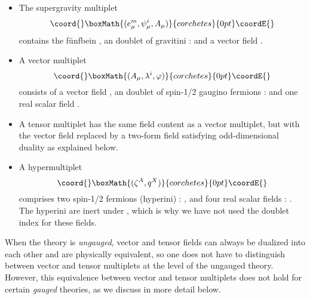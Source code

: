 \documentclass[a4paper,11pt]{article}
\begin{document}
\begin{itemize}
\item The supergravity multiplet
\begin{displaymath}\coord{}\boxMath{
(e_{\mu}^m,\psi_{\mu}^i,A_{\mu})
}{corchetes}{0pt}\coordE{}\end{displaymath}
contains the f\"{u}nfbein \coordHE{}, an \coordHE{} doublet of
gravitini \coordHE{}: \coordHE{} and a vector field \coordHE{}.

\item A vector multiplet
\begin{displaymath}\coord{}\boxMath{
(A_{\mu},\lambda^i,\varphi)
}{corchetes}{0pt}\coordE{}\end{displaymath}
consists of a vector field \coordHE{}, an \coordHE{} doublet of spin-1/2
gaugino fermions \coordHE{}: \coordHE{} and one real
scalar field \myHighlight{$\varphi$}\coordHE{}.

\item A tensor  multiplet
has the same field content as a vector multiplet, but with the vector
field \coordHE{} replaced by a two-form field \coordHE{} satisfying
odd-dimensional duality as explained below.

\item A hypermultiplet
\begin{displaymath}\coord{}\boxMath{
(\zeta^A,q^X)
}{corchetes}{0pt}\coordE{}\end{displaymath}
comprises two spin-1/2 fermions (hyperini) \coordHE{}:
\coordHE{}, and four real scalar fields \coordHE{}: \coordHE{}.
The hyperini are inert under \coordHE{}, which is why we have
not used the \coordHE{} doublet index \coordHE{} for these fields.
\end{itemize}


When the theory is \emph{ungauged}, vector and tensor fields can always be
dualized into each other and are physically equivalent, so one does not
have to distinguish between vector and tensor multiplets at the level of
the ungauged theory. However, this equivalence between vector and tensor
multiplets does not hold for certain \emph{gauged} theories, as we discuss
in more detail below. 
\end{document}
